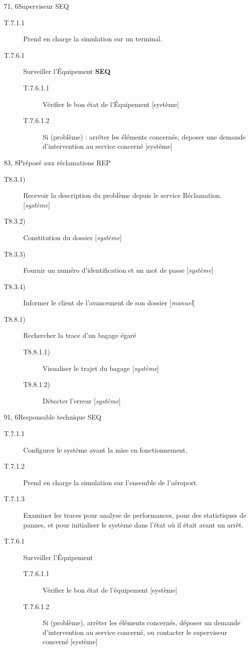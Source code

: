 \dta
{7}{1, 6}{Superviseur}
{SEQ}
{
\begin{description}
	\item[T.7.1.1] Prend en charge la simulation sur un terminal.
	\item[T.7.6.1] Surveiller l'Équipement \textbf{SEQ}
	\begin{description}
		\item[T.7.6.1.1] Vérifier le bon état de l'Équipement [système]
		\item[T.7.6.1.2] Si (problème) : arrêter les éléments concernés, deposer une demande d'intervention au service concerné [système]
	\end{description}
\end{description}
}

\dta
{8}{3, 8}{Préposé aux réclamations}
{REP}
{
\begin{description}
	\item [T8.3.1)] Recevoir la description du problème depuis le service \og Réclamation\fg. [\textsl{système}]
	\item [T8.3.2)] Constitution du dossier [\textsl{système}] 
	\item [T8.3.3)] Fournir un numéro d'identification et un mot de passe [\textsl{système}]
	\item [T8.3.4)] Informer le client de l'avancement de son dossier [\textsl{manuel}]
	\item [T8.8.1)] Rechercher la trace d'un bagage égaré
	\begin{description}
		\item [T8.8.1.1)] Visualiser le trajet du bagage [\textsl{système}]
		\item [T8.8.1.2)] Détecter l'erreur [\textsl{système}]
	\end{description}
\end{description}
}

{9}{1, 6}{Responsable technique}
{SEQ}
{
\begin{description}
	\item[T.7.1.1] Configurer le système avant la mise en fonctionnement.
	\item[T.7.1.2] Prend en charge la simulation sur l'ensemble de l'aéroport.
	\item[T.7.1.3] Examiner les traces pour analyse de performances, pour des statistiques de pannes, et pour initialiser le système dans l'état où il était avant un arrêt.

	\item[T.7.6.1] Surveiller l'Équipement
	\begin{description}
		\item[T.7.6.1.1] Vérifier le bon état de l'équipement [système]
		\item[T.7.6.1.2] Si (problème), arrêter les éléments concernés, déposer un
		demande d'intervention au service concerné, ou contacter le superviseur concerné [système]
	\end{description}
\end{description}
}

